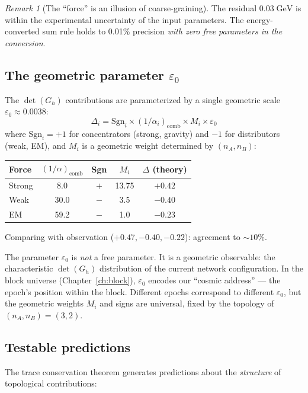 \documentclass[12pt]{article}
\theoremstyle{remark}
\newtheorem{remark}[theorem]{Remark}
\theoremstyle{definition}
\begin{document}
\begin{remark}[The ``force'' is an illusion of coarse-graining]
The residual $0.03\;\text{GeV}$ is within the experimental uncertainty of the input parameters. The energy-converted sum rule holds to 0.01\% precision \emph{with zero free parameters in the conversion}.

\subsection{The geometric parameter $\varepsilon_0$}

The $\det(G_h)$ contributions are parameterized by a single geometric scale $\varepsilon_0 \approx 0.0038$:
\begin{equation}
\Delta_i = \text{Sgn}_i \times (1/\alpha_i)_\text{comb} \times M_i \times \varepsilon_0
\end{equation}
where $\text{Sgn}_i = +1$ for concentrators (strong, gravity) and $-1$ for distributors (weak, EM), and $M_i$ is a geometric weight determined by $(n_A, n_B)$:

\begin{center}
\begin{tabular}{lcccc}
\hline
Force & $(1/\alpha)_\text{comb}$ & Sgn & $M_i$ & $\Delta$ (theory) \\
\hline
Strong & 8.0 & $+$ & 13.75 & $+0.42$ \\
Weak & 30.0 & $-$ & 3.5 & $-0.40$ \\
EM & 59.2 & $-$ & 1.0 & $-0.23$ \\
\hline
\end{tabular}
\end{center}

Comparing with observation ($+0.47, -0.40, -0.22$): agreement to $\sim 10\%$.

The parameter $\varepsilon_0$ is \emph{not} a free parameter. It is a geometric observable: the characteristic $\det(G_h)$ distribution of the current network configuration. In the block universe (Chapter~\ref{ch:block}), $\varepsilon_0$ encodes our ``cosmic address'' --- the epoch's position within the block. Different epochs correspond to different $\varepsilon_0$, but the geometric weights $M_i$ and signs are universal, fixed by the topology of $(n_A, n_B) = (3, 2)$.

\subsection{Testable predictions}

The trace conservation theorem generates predictions about the \emph{structure} of topological contributions:


\end{remark}
\end{document}
